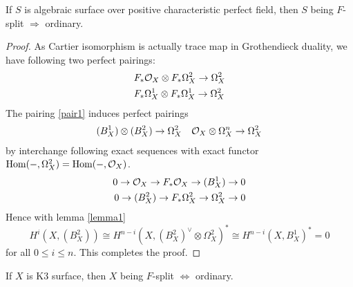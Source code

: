 \begin{secprop}
\label{sec3}
	If $S$ is algebraic surface over positive characteristic perfect field, then $S$ being $F$-split $\Rightarrow$ ordinary.
\end{secprop}
\begin{proof}
	As Cartier isomorphism is actually trace map in Grothendieck duality, we have following two perfect pairings:
	\begin{align}
		\label{pair1}&F_* \mathcal{O}_{X} \otimes F_* \Omega_X^2 \to \Omega_X^2\\
		&F_* \Omega_X^1 \otimes F_*\Omega_X^1 \to \Omega_X^2
	\end{align}
	The pairing \ref{pair1} induces perfect pairings
	\begin{align}
	\label{pair2} (B_X^1) \otimes (B_X^2) \to \Omega_X^2& & \mathcal{O}_{X} \otimes \Omega_X^n \to \Omega_X^2
	\end{align}
	by interchange following exact sequences with exact functor $\text{Hom}(-, \Omega_X^2) = \text{Hom} (-, \mathcal{O}_{X})$.
	\[
	\begin{aligned}
	0 \to \mathcal{O}_{X} \to F_* \mathcal{O}_{X} \to (B_X^1) \to 0 \\
	0 \to (B_X^2) \to F_* \Omega_X^2 \to \Omega_X^2 \to 0
	\end{aligned}	
	\]
	Hence with lemma \ref{lemma1}
	\begin{equation}
		H^i(X, (B_X^2)) \cong H^{n-i}(X,(B_X^2)^{\vee} \otimes \Omega_X^2)^* \cong H^{n-i}(X, B^1_X)^*=0
	\end{equation}
	for all $0 \leq i \leq n$. This completes the proof.
\end{proof}
\begin{seccor}
	If $X$ is K3 surface, then $X$ being $F$-split $\Leftrightarrow$ ordinary.
\end{seccor}

